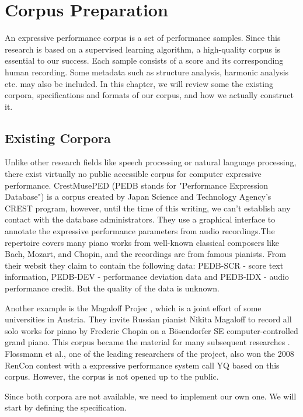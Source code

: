 \chapter{Corpus Preparation}
\label{chap:corpus}
  An expressive performance corpus is a set of performance samples. Since this research is based on a supervised learning algorithm, a high-quality corpus is essential to our success. Each sample consists of a score and its corresponding human recording. Some metadata such as structure analysis, harmonic analysis etc. may also be included. In this chapter, we will review some the existing corpora, specifications and formats of our corpus, and how we actually construct it.

\section{Existing Corpora} 
Unlike other research fields like speech processing or natural language processing, there exist virtually no public accessible corpus for computer expressive performance. CrestMusePED \cite{crestmuse} (PEDB stands for "Performance Expression Database") is a corpus created by Japan Science and Technology Agency's CREST program, however, until the time of this writing, we can't establish any contact with the database administrators. They use a graphical interface to annotate the expressive performance parameters from audio recordings.The repertoire covers many piano works from well-known classical composers like Bach, Mozart, and Chopin, and the recordings are from famous pianists. From their websit \cite{crestmuse}they claim to contain the following data: PEDB-SCR - score text information, PEDB-DEV - performance deviation data and PEDB-IDX - audio performance credit. But the quality of the data is unknown.

Another example is the Magaloff Projec \cite{magaloff}, which is a joint effort of some universities in Austria. They invite Russian pianist Nikita Magaloff to record all solo works for piano by Frederic Chopin on a Bösendorfer SE computer-controlled grand piano. This corpus became the material for many subsequent researches \cite{Goebl2009, Grachten2011, Flossmann2009, Grachten2012, Flossmann2013, Flossman2011, Flossmann2010a}. Flossmann et al., one of the leading researchers of the project, also won the 2008 RenCon contest with a expressive performance system call YQ \cite{yqx} based on this corpus. However, the corpus is not opened up to the public. 

Since both corpora are not available, we need to implement our own one. We will start by defining the specification.

